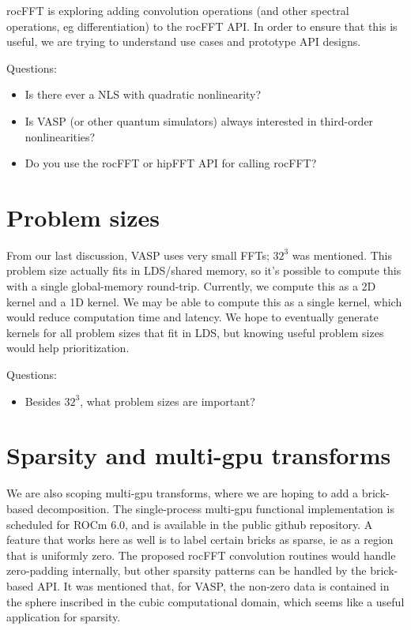 \documentclass[12pt]{article}
\renewcommand{\(}{\left(}
\renewcommand{\)}{\right)}
\begin{document}
rocFFT is exploring adding convolution operations (and other spectral
operations, eg differentiation) to the rocFFT API.  In order to ensure
that this is useful, we are trying to understand use cases and
prototype API designs.

Questions:
\begin{itemize}
\item Is there ever a NLS with quadratic nonlinearity?
\item Is VASP (or other quantum simulators) always interested in
  third-order nonlinearities?
\item Do you use the rocFFT or hipFFT API for calling rocFFT?
\end{itemize}

\section{Problem sizes}

From our last discussion, VASP uses very small FFTs; $32^3$ was
mentioned.  This problem size actually fits in LDS/shared memory, so
it's possible to compute this with a single global-memory round-trip.
Currently, we compute this as a 2D kernel and a 1D kernel.  We may be
able to compute this as a single kernel, which would reduce
computation time and latency. We hope to eventually generate kernels
for all problem sizes that fit in LDS, but knowing useful problem sizes
would help prioritization.

Questions:
\begin{itemize}
\item Besides $32^3$, what problem sizes are important?
\end{itemize}

\section{Sparsity and multi-gpu transforms}

We are also scoping multi-gpu transforms, where we are hoping to add a
brick-based decomposition.  The single-process multi-gpu functional
implementation is scheduled for ROCm 6.0, and is available in the
public github repository.  A feature that works here as well is to
label certain bricks as sparse, ie as a region that is uniformly zero.
The proposed rocFFT convolution routines would handle zero-padding
internally, but other sparsity patterns can be handled by the
brick-based API.  It was mentioned that, for VASP, the non-zero data
is contained in the sphere inscribed in the cubic computational
domain, which seems like a useful application for sparsity.
\end{document}

